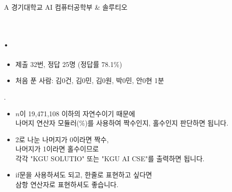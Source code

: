
\setproblem
    {A}
    {경기대학교 AI 컴퓨터공학부 \& 솔루티오}

\section{\pletter. \ptitle}

\begin{frame}[label=problem-A] %
    \sectiontitle{\pletter}{\ptitle}
    \begin{itemize}
        \item 제출 32번, 정답 25명 (정답률 78.1\%)
        \item 처음 푼 사람: 김0건, 김0민, 김0원, 박0민, 안0현 1분
    \end{itemize}
\end{frame}
\begin{frame}{\textbf{\pletter}. \ptitle}
    \begin{itemize}
        \item $n$이 19,471,108 이하의 자연수이기 때문에 \\
        나머지 연산자 모듈러(\%)를 사용하여 짝수인지, 홀수인지 판단하면 됩니다.
        \item 2로 나눈 나머지가 0이라면 짝수,\\
        나머지가 1이라면 홀수이므로\\
        각각 "KGU SOLUTIO" 또는 "KGU AI CSE"를 출력하면 됩니다.
        \item if문을 사용하셔도 되고, 한줄로 표현하고 싶다면\\
        삼항 연산자로 표현하셔도 좋습니다.
    \end{itemize}
\end{frame}
